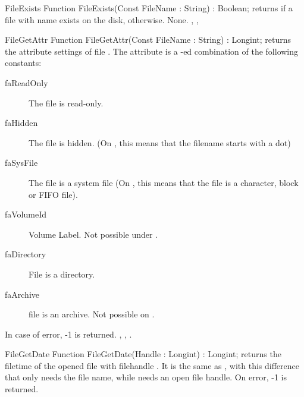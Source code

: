 

\begin{function}{FileExists}
\Declaration
Function FileExists(Const FileName : String) : Boolean;
\Description
{} returns  if a file with name 
exists on the disk,  otherwise.
\Errors
None.
\SeeAlso
{}, , 
\end{function}




 
\begin{function}{FileGetAttr}
\Declaration
Function FileGetAttr(Const FileName : String) : Longint;
\Description
{} returns the attribute settings of file 
. The attribute is a -ed combination
of the following constants: 
\begin{description}
\item[faReadOnly] The file is read-only.
\item[faHidden] The file is hidden. (On \linux, this means that the filename
starts with a dot)
\item[faSysFile] The file is a system file (On \linux, this means that the
file is a character, block or FIFO file).
\item[faVolumeId] Volume Label. Not possible under \linux.
\item[faDirectory] File is a directory.
\item[faArchive] file is an archive. Not possible on \linux.
\end{description}
\Errors
In case of error, -1 is returned.
\SeeAlso
{}, , .
\end{function}



\begin{function}{FileGetDate}
\Declaration
Function FileGetDate(Handle : Longint) : Longint;
\Description
{} returns the filetime of the opened file with filehandle
. It is the same as , with this difference that
 only needs the file name, while  needs an
open file handle.
\Errors
On error, -1 is returned.
\SeeAlso
{}
\end{function}


